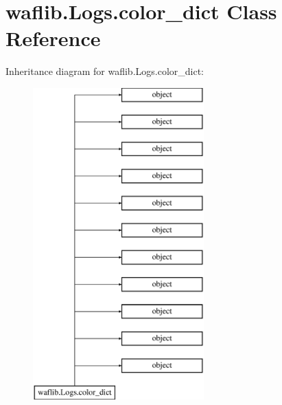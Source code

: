 \hypertarget{classwaflib_1_1_logs_1_1color__dict}{}\section{waflib.\+Logs.\+color\+\_\+dict Class Reference}
\label{classwaflib_1_1_logs_1_1color__dict}
Inheritance diagram for waflib.\+Logs.\+color\+\_\+dict\+:\begin{figure}[H]
\begin{center}
\leavevmode
\includegraphics[height=12.000000cm]{classwaflib_1_1_logs_1_1color__dict}
\end{center}
\end{figure}
